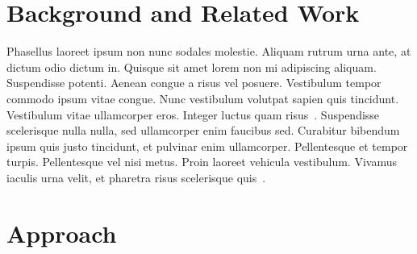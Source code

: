 \documentclass[10pt, conference]{IEEEtran}
\begin{document}
\section{Background and Related Work}
\label{sec:backgr-relat-work}

Phasellus laoreet ipsum non nunc sodales molestie. Aliquam rutrum urna ante, at dictum odio dictum in. Quisque sit amet lorem non mi adipiscing aliquam. Suspendisse potenti. Aenean congue a risus vel posuere. Vestibulum tempor commodo ipsum vitae congue. Nunc vestibulum volutpat sapien quis tincidunt. Vestibulum vitae ullamcorper eros. Integer luctus quam risus~\cite{humble10}. Suspendisse scelerisque nulla nulla, sed ullamcorper enim faucibus sed. Curabitur bibendum ipsum quis justo tincidunt, et pulvinar enim ullamcorper. Pellentesque et tempor turpis. Pellentesque vel nisi metus. Proin laoreet vehicula vestibulum. Vivamus iaculis urna velit, et pharetra risus scelerisque quis~\cite{baysal11}.

\section{Approach}
\label{sec:approach}
\end{document}
